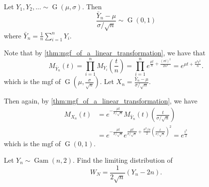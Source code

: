 \documentclass[notoc,notitlepage]{tufte-book}
\DeclareMathOperator{\Gau}{G }
\DeclareMathOperator{\Gam}{Gam }
\begin{document}
\begin{eg}[Example 5.7]
  Let $Y_1, Y_2, ... \sim \Gau(\mu, \sigma)$. Then
  \begin{equation*}
    \frac{\bar{Y}_n - \mu}{\sigma / \sqrt{n}} \sim \Gau(0, 1)
  \end{equation*}
  where $\bar{Y}_n = \frac{1}{n} \sum_{i=1}^{n} Y_i$.
\end{eg}

\begin{solution}
  Note that by \cref{thm:mgf_of_a_linear_transformation}, we have that
  \begin{equation*}
  M_{\bar{Y}_n}(t) = \prod_{i=1}^{n} M_{Y_i}\left(\frac{t}{n}\right) = \prod_{i=1}^{n} e^{\frac{\mu t}{n} + \frac{(\sigma t)^2}{2 n^2}} = e^{ \mu t + \frac{\sigma^2 t^2}{n} }.
  \end{equation*}
  which is the mgf of $\Gau\left(\mu, \frac{\sigma}{\sqrt{n}}\right)$. Let $X_n = \frac{\bar{Y}_n - \mu}{\sigma / \sqrt{n}}$.
  
  Then again, by \cref{thm:mgf_of_a_linear_transformation}, we have
  \begin{align*}
    M_{X_n}(t) &= e^{- \frac{\mu t}{\sigma / \sqrt{n}}} M_{\bar{Y}_n}(t) \left( \frac{t}{\sigma / \sqrt{n}} \right) \\
    &= e^{- \frac{\mu t}{\sigma / \sqrt{n}}} e^{ \frac{\mu t}{\sigma / \sqrt{n}} + \frac{\sigma^2 / n}{2} \left( \frac{t}{\sigma / \sqrt{n}} \right)^2 } = e^{\frac{t^2}{2}}
  \end{align*}
  which is the mgf of $\Gau(0, 1)$.
\end{solution}

\begin{eg}[Example 5.8]\label{eg:5_8}
  Let $Y_n \sim \Gam( n, 2 )$. Find the limiting distribution of
  \begin{equation*}
    W_N = \frac{1}{2 \sqrt{n}} ( Y_n - 2n ).
  \end{equation*}
\end{eg}
\end{document}
